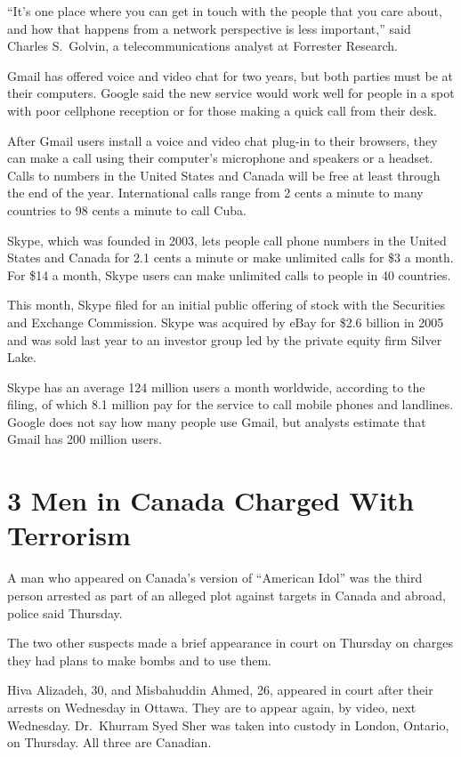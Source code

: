 ﻿\documentclass[12pt]{article}
\begin{document}
``It's one place where you can get in touch with the people that you care about, and how that
happens from a network perspective is less important,'' said Charles S.~Golvin, a telecommunications
analyst at Forrester Research.

Gmail has offered voice and video chat for two years, but both parties must be at their computers.
Google said the new service would work well for people in a spot with poor cellphone reception or
for those making a quick call from their desk.

After Gmail users install a voice and video chat plug-in to their browsers, they can make a call
using their computer's microphone and speakers or a headset. Calls to numbers in the United States
and Canada will be free at least through the end of the year. International calls range from 2 cents
a minute to many countries to 98 cents a minute to call Cuba.

Skype, which was founded in 2003, lets people call phone numbers in the United States and Canada for
2.1 cents a minute or make unlimited calls for \$3 a month. For \$14 a month, Skype users can make
unlimited calls to people in 40 countries.

This month, Skype filed for an initial public offering of stock with the Securities and Exchange
Commission. Skype was acquired by eBay for \$2.6 billion in 2005 and was sold last year to an
investor group led by the private equity firm Silver Lake.

Skype has an average 124 million users a month worldwide, according to the filing, of which 8.1
million pay for the service to call mobile phones and landlines. Google does not say how many people
use Gmail, but analysts estimate that Gmail has 200 million users.

\pagebreak
\section{3 Men in Canada Charged With Terrorism}

\lettrine{A}{} man who appeared on Canada's version of ``American Idol'' was
the third person arrested as part of an alleged plot against targets in Canada and abroad, police
said Thursday.

The two other suspects made a brief appearance in court on Thursday on charges they had plans to
make bombs and to use them.

Hiva Alizadeh, 30, and Misbahuddin Ahmed, 26, appeared in court after their arrests on Wednesday in
Ottawa. They are to appear again, by video, next Wednesday. Dr.~Khurram Syed Sher was taken into
custody in London, Ontario, on Thursday. All three are Canadian.
\end{document}
